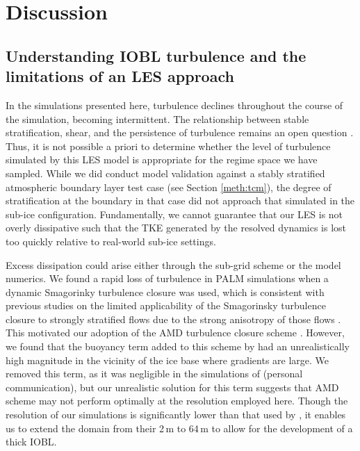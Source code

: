 \documentclass[tc, manuscript]{copernicus}
\begin{document}
\section{Discussion}\label{disc}

\subsection{Understanding IOBL turbulence and the limitations of an LES approach} \label{disc:dyn}

In the simulations presented here, turbulence declines throughout the course of the simulation, becoming intermittent. The relationship between stable stratification, shear, and the persistence of turbulence remains an open question \citep{zonta_stably_2018}. Thus, it is not possible a priori to determine whether the level of turbulence simulated by this LES model is appropriate for the regime space we have sampled. While we did conduct model validation against a stably stratified atmospheric boundary layer test case (see Section \ref{meth:tcm}), the degree of stratification at the boundary in that case did not approach that simulated in the sub-ice configuration. Fundamentally, we cannot guarantee that our LES is not overly dissipative such that the TKE generated by the resolved dynamics is lost too quickly relative to real-world sub-ice settings. 

Excess dissipation could arise either through the sub-grid scheme or the model numerics. We found a rapid loss of turbulence in PALM simulations when a dynamic Smagorinky turbulence closure was used, which is consistent with previous studies on the limited applicability of the Smagorinsky turbulence closure to strongly stratified flows due to the strong anisotropy of those flows \citep{flores_analysis_2011, jimenez_large-eddy_2005}. This motivated our adoption of the AMD turbulence closure scheme \citep{abkar_minimum-dissipation_2016}. However, we found that the buoyancy term added to this scheme by \citet{abkar_large-eddy_2017} had an unrealistically high magnitude in the vicinity of the ice base where gradients are large. We removed this term, as it was negligible in the simulations of \citet{vreugdenhil_stratification_2019} (personal communication), but our unrealistic solution for this term suggests that AMD scheme may not perform optimally at the resolution employed here. Though the resolution of our simulations is significantly lower than that used by \citet{vreugdenhil_stratification_2019}, it enables us to extend the domain from their 2\,\unit{m} to 64\,\unit{m} to allow for the development of a thick IOBL. 
\end{document}
